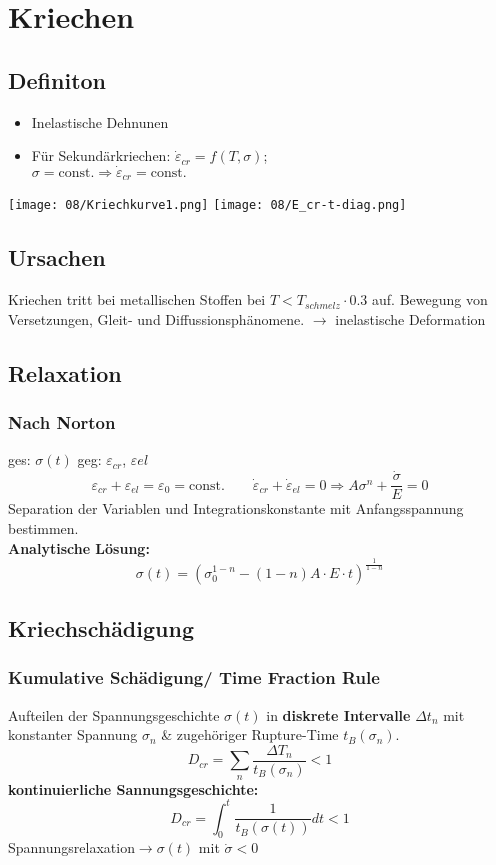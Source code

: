 \section{Kriechen}
    \subsection{Definiton}
        \begin{itemize}
            \item Inelastische Dehnunen
            \item Für Sekundärkriechen: $\dot{\varepsilon}_{cr} = f(T,\sigma)$;\\$\sigma = \textrm{const.} \Rightarrow \dot{\varepsilon}_{cr}= \textrm{const.}$
        \end{itemize}
        \texttt{[image: 08/Kriechkurve1.png]}
        \texttt{[image: 08/E\_cr-t-diag.png]}
    \subsection{Ursachen}
        Kriechen tritt bei metallischen Stoffen bei $ T < T_{schmelz} \cdot 0.3  $ auf.
        Bewegung von Versetzungen, Gleit- und Diffussionsphänomene. $\rightarrow$ inelastische Deformation  
        
    \subsection{Relaxation}
        \subsubsection{Nach Norton}
            ges: $\sigma(t)$ geg: $\varepsilon_{cr}$, $\varepsilon{el}$
            \[\varepsilon_{cr}+\varepsilon_{el}=\varepsilon_0=\textrm{const.} \qquad \dot{\varepsilon}_{cr}+\dot{\varepsilon}_{el}=0 \Rightarrow A\sigma^n + \frac{\dot{\sigma}}{E}=0\]
            Separation der Variablen und Integrationskonstante mit Anfangsspannung bestimmen.
            \\\textbf{Analytische Lösung:}
            \[\sigma(t)=\left(\sigma_{0}^{1-n}-(1-n)A\cdot E\cdot t\right)^{\frac{1}{1-n}}\]
    \subsection{Kriechschädigung}
        \subsubsection{Kumulative Schädigung/ Time Fraction Rule}
            Aufteilen der Spannungsgeschichte $\sigma(t)$ in \textbf{diskrete Intervalle} $\Delta t_n$ mit konstanter Spannung $\sigma_n$ \& zugehöriger Rupture-Time $t_B(\sigma_n)$.
            \[D_{cr}=\sum_n\frac{\Delta T_{n}}{t_B(\sigma_n)} < 1\]
            \textbf{kontinuierliche Sannungsgeschichte:}
            \[D_{cr}=\int_0^t\frac{1}{t_B(\sigma(t))}dt < 1\]
            Spannungsrelaxation$\rightarrow \sigma(t)$ mit $\dot{\sigma}<0$
